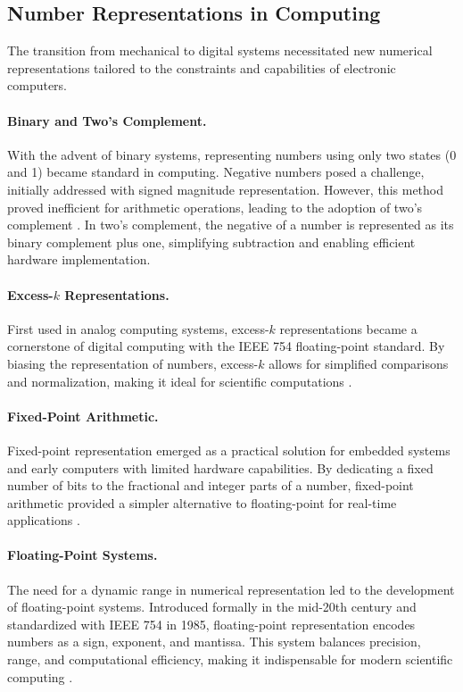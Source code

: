\subsection{Number Representations in Computing}

The transition from mechanical to digital systems necessitated new numerical representations tailored to the constraints and capabilities of electronic computers.

\paragraph{Binary and Two's Complement.}
With the advent of binary systems, representing numbers using only two states (0 and 1) became standard in computing. Negative numbers posed a challenge, initially addressed with signed magnitude representation. However, this method proved inefficient for arithmetic operations, leading to the adoption of two's complement \cite{kline1990mathematics}. In two's complement, the negative of a number is represented as its binary complement plus one, simplifying subtraction and enabling efficient hardware implementation.

\paragraph{Excess-\( k \) Representations.}
First used in analog computing systems, excess-\( k \) representations became a cornerstone of digital computing with the IEEE 754 floating-point standard. By biasing the representation of numbers, excess-\( k \) allows for simplified comparisons and normalization, making it ideal for scientific computations \cite{goldberg1991}.

\paragraph{Fixed-Point Arithmetic.}
Fixed-point representation emerged as a practical solution for embedded systems and early computers with limited hardware capabilities. By dedicating a fixed number of bits to the fractional and integer parts of a number, fixed-point arithmetic provided a simpler alternative to floating-point for real-time applications \cite{smith1997science}.

\paragraph{Floating-Point Systems.}
The need for a dynamic range in numerical representation led to the development of floating-point systems. Introduced formally in the mid-20th century and standardized with IEEE 754 in 1985, floating-point representation encodes numbers as a sign, exponent, and mantissa. This system balances precision, range, and computational efficiency, making it indispensable for modern scientific computing \cite{goldberg1991}.

